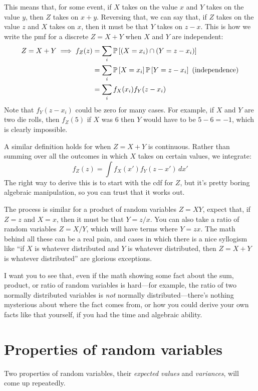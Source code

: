 This means that, for some event, if $X$ takes on the value $x$ and $Y$ takes
on the value $y$, then $Z$ takes on $x+y$. Reversing that, we can say that, if
$Z$ takes on the value $z$ and $X$ takes on $x$, then it must be that $Y$
takes on $z - x$. This is how we write the pmf for a discrete $Z = X + Y$ when
$X$ and $Y$ are independent:
\begin{align*}
Z = X + Y \implies f_Z(z) &= \sum_i \mathbb{P}\left[{(X=x_i) \cap (Y=z - x_i)}\right] \\
  &= \sum_i \mathbb{P}\left[{X=x_i}\right] \mathbb{P}\left[{Y=z-x_i}\right] \text{ (independence)} \\
  &= \sum_i f_X(x_i) f_Y(z - x_i)
\end{align*}
Note that $f_Y(z-x_i)$ could be zero for many cases. For example, if $X$ and
$Y$ are two die rolls, then $f_Z(5)$ if $X$ was 6 then $Y$ would have to be $5
- 6 = -1$, which is clearly impossible.

A similar definition holds for when $Z = X + Y$ is continuous. Rather than
summing over all the outcomes in which $X$ takes on certain values, we integrate:
\begin{equation}
f_Z(z) = \int f_X(x') f_Y(z - x') \,dx'
\end{equation}
The right way to derive this is to start with the cdf for $Z$, but it's pretty
boring algebraic manipulation, so you can trust that it works out.

The process is similar for a product of random variables $Z = XY$, expect
that, if $Z = z$ and $X = x$, then it must be that $Y = z/x$. You can also
take a ratio of random variables $Z = X/Y$, which will have terms where $Y =
zx$. The math behind all these can be a real pain, and cases in which there is
a nice syllogism like ``if $X$ is whatever distributed and $Y$ is whatever
distributed, then $Z = X + Y$ is whatever distributed'' are glorious
exceptions.

I want you to see that, even if the math showing some fact about the sum,
product, or ratio of random variables is hard---for example, the ratio of two
normally distributed variables is \emph{not} normally distributed---there's
nothing mysterious about where the fact comes from, or how you could derive
your own facts like that yourself, if you had the time and algebraic ability.

\section{Properties of random variables}

Two properties of random variables, their \emph{expected values} and
\emph{variances}, will come up repeatedly.

